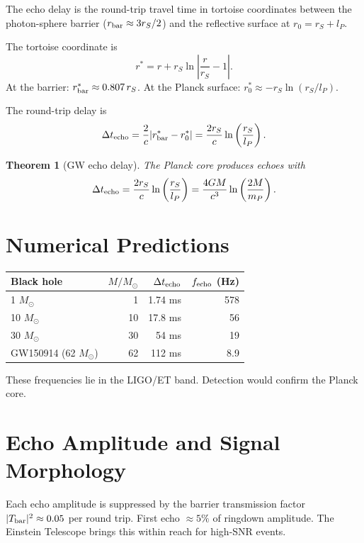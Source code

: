 \documentclass[12pt]{article}
\newtheorem{theorem}{Theorem}[section]
\newcommand{\Dt}{\Delta t_{\rm echo}}
\begin{document}
The echo delay is the round-trip travel time in tortoise coordinates between the photon-sphere barrier (\(r_{\rm bar} \approx 3 r_S/2\)) and the reflective surface at \(r_0 = r_S + l_P\).

The tortoise coordinate is
\[
r^* = r + r_S \ln\left|\frac{r}{r_S}-1\right|.
\]
At the barrier: \(r^*_{\rm bar} \approx 0.807\, r_S\).  
At the Planck surface: \(r^*_0 \approx - r_S \ln(r_S/l_P)\).  

The round-trip delay is
\[
\Dt = \frac{2}{c} |r^*_{\rm bar} - r^*_0| = \frac{2 r_S}{c} \ln\left(\frac{r_S}{l_P}\right).
\]

\begin{theorem}[GW echo delay]
The Planck core produces echoes with
\[
\Dt = \frac{2 r_S}{c} \ln\left(\frac{r_S}{l_P}\right) = \frac{4 G M}{c^3} \ln\left(\frac{2 M}{m_P}\right).
\]
\end{theorem}

\section{Numerical Predictions}

\begin{table}[h]
\centering
\begin{tabular}{lrrr}
\toprule
Black hole & \(M/M_\odot\) & \(\Dt\) & \(f_{\rm echo}\) (Hz) \\
\midrule
1 \(M_\odot\) & 1 & 1.74 ms & 578 \\
10 \(M_\odot\) & 10 & 17.8 ms & 56 \\
30 \(M_\odot\) & 30 & 54 ms & 19 \\
GW150914 (62 \(M_\odot\)) & 62 & 112 ms & 8.9 \\
\bottomrule
\end{tabular}
\end{table}

These frequencies lie in the LIGO/ET band. Detection would confirm the Planck core.

\section{Echo Amplitude and Signal Morphology}

Each echo amplitude is suppressed by the barrier transmission factor \(|T_{\rm bar}|^2 \approx 0.05\) per round trip. First echo \(\approx 5\%\) of ringdown amplitude. The Einstein Telescope brings this within reach for high-SNR events.
\end{document}
